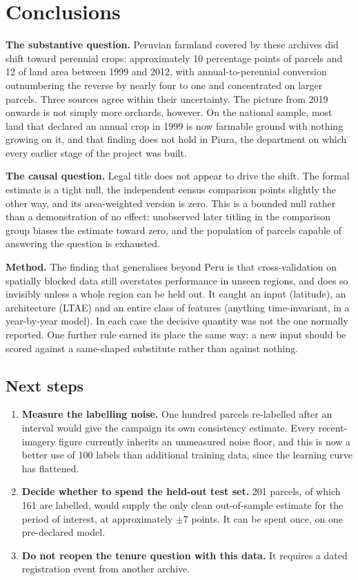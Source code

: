 \documentclass[11pt,a4paper]{article}
\begin{document}
\section{Conclusions}

\textbf{The substantive question.} Peruvian farmland covered by these archives did shift toward
perennial crops: approximately 10 percentage points of parcels and 12 of land area between 1999
and 2012, with annual-to-perennial conversion outnumbering the reverse by nearly four to one and
concentrated on larger parcels. Three sources agree within their uncertainty. The picture from
2019 onwards is not simply more orchards, however. On the national sample, most land that
declared an annual crop in 1999 is now farmable ground with nothing growing on it, and that
finding does not hold in Piura, the department on which every earlier stage of the project was
built.

\textbf{The causal question.} Legal title does not appear to drive the shift. The formal estimate
is a tight null, the independent census comparison points slightly the other way, and its
area-weighted version is zero. This is a bounded null rather than a demonstration of no effect:
unobserved later titling in the comparison group biases the estimate toward zero, and the
population of parcels capable of answering the question is exhausted.

\textbf{Method.} The finding that generalises beyond Peru is that cross-validation on spatially
blocked data still overstates performance in unseen regions, and does so invisibly unless a whole
region can be held out. It caught an input (latitude), an architecture (LTAE) and an entire class
of features (anything time-invariant, in a year-by-year model). In each case the decisive
quantity was not the one normally reported. One further rule earned its place the same way: a new
input should be scored against a same-shaped substitute rather than against nothing.

\subsection*{Next steps}

\begin{enumerate}[leftmargin=1.6em,itemsep=2pt]
\item \textbf{Measure the labelling noise.} One hundred parcels re-labelled after an interval
would give the campaign its own consistency estimate. Every recent-imagery figure currently
inherits an unmeasured noise floor, and this is now a better use of 100 labels than additional
training data, since the learning curve has flattened.
\item \textbf{Decide whether to spend the held-out test set.} 201 parcels, of which 161 are
labelled, would supply the only clean out-of-sample estimate for the period of interest, at
approximately $\pm$7 points. It can be spent once, on one pre-declared model.
\item \textbf{Do not reopen the tenure question with this data.} It requires a dated registration
event from another archive.
\end{enumerate}
\end{document}
